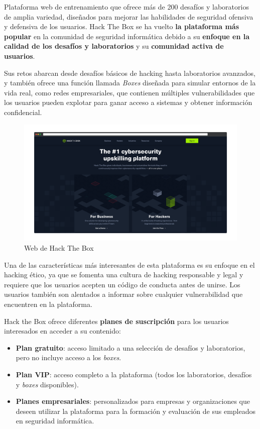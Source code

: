         Plataforma web de entrenamiento que ofrece más de 200 desafíos y laboratorios de amplia variedad, diseñados para mejorar las habilidades de seguridad ofensiva y defensiva de los usuarios. Hack The Box se ha vuelto \textbf{la plataforma más popular} en la comunidad de seguridad informática debido a su \textbf{enfoque en la calidad de los desafíos y laboratorios} y su \textbf{comunidad activa de usuarios}.
        
        Sus retos abarcan desde desafíos básicos de hacking hasta laboratorios avanzados, y también ofrece una función llamada \textit{Boxes} diseñada para simular entornos de la vida real, como redes empresariales, que contienen múltiples vulnerabilidades que los usuarios pueden explotar para ganar acceso a sistemas y obtener información confidencial.
        
        \begin{figure}[h]
            \centering
            \includegraphics[width=\textwidth]{images/Capturas/Web de HTB.png}
            \caption{Web de Hack The Box}
            \label{fig:HTB-web}
        \end{figure}
        
        Una de las características más interesantes de esta plataforma es su enfoque en el hacking ético, ya que se fomenta una cultura de hacking responsable y legal y requiere que los usuarios acepten un código de conducta antes de unirse. Los usuarios también son alentados a informar sobre cualquier vulnerabilidad que encuentren en la plataforma.
        
        Hack the Box ofrece diferentes \textbf{planes de suscripción} para los usuarios interesados en acceder a su contenido:
        
        \begin{itemize}
            \item \textbf{Plan gratuito}: acceso limitado a una selección de desafíos y laboratorios, pero no incluye acceso a los \textit{boxes}.
        
            \item \textbf{Plan VIP}: acceso completo a la plataforma (todos los laboratorios, desafíos y \textit{boxes} disponibles).
        
            \item \textbf{Planes empresariales}: personalizados para empresas y organizaciones que deseen utilizar la plataforma para la formación y evaluación de sus empleados en seguridad informática.
        \end{itemize}
        
